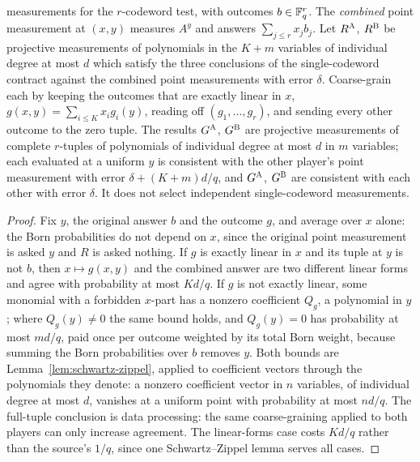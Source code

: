 \begin{lemma}
measurements for the $r$-codeword test, with outcomes $b\in\mathbb{F}_q^r$. The \emph{combined} point
measurement at $(x,y)$ measures $A^y$ and answers $\sum_{j\leq r}x_jb_j$. Let $R^{\textsc{A}}$,
$R^{\textsc{B}}$ be projective measurements of polynomials in the $K+m$ variables of individual degree at
most $d$ which satisfy the three conclusions of the single-codeword contract against the combined
point measurements with error $\delta$. Coarse-grain each by keeping the outcomes that are
exactly linear in $x$, $g(x,y)=\sum_{i\leq K}x_ig_i(y)$, reading off $(g_1,\ldots,g_r)$, and
sending every other outcome to the zero tuple. The results $G^{\textsc{A}}$, $G^{\textsc{B}}$ are projective
measurements of complete $r$-tuples of polynomials of individual degree at most $d$ in $m$
variables; each evaluated at a uniform $y$ is consistent with the other player's point
measurement with error $\delta+(K+m)d/q$, and $G^{\textsc{A}}$, $G^{\textsc{B}}$ are consistent with each other
with error $\delta$. It does not select independent single-codeword measurements.
\end{lemma}

\begin{proof}
\leanok
{}
Fix $y$, the original answer $b$ and the outcome $g$, and average over $x$ alone: the Born
probabilities do not depend on $x$, since the original point measurement is asked $y$ and $R$ is
asked nothing. If $g$ is exactly linear in $x$ and its tuple at $y$ is not $b$, then
$x\mapsto g(x,y)$ and the combined answer are two different linear forms and agree with probability
at most $Kd/q$. If $g$ is not exactly linear, some monomial with a forbidden $x$-part has a nonzero
coefficient $Q_g$, a polynomial in $y$; where $Q_g(y)\neq0$ the same bound holds, and $Q_g(y)=0$ has
probability at most $md/q$, paid once per outcome weighted by its total Born weight, because summing
the Born probabilities over $b$ removes $y$. Both bounds are Lemma~\ref{lem:schwartz-zippel},
applied to coefficient vectors through the polynomials they denote: a nonzero coefficient vector in
$n$ variables, of individual degree at most $d$, vanishes at a uniform point with probability at
most $nd/q$. The full-tuple conclusion is data processing: the same coarse-graining applied to both
players can only increase agreement. The linear-forms case costs $Kd/q$ rather than the source's
$1/q$, since one Schwartz--Zippel lemma serves all cases.
\end{proof}

